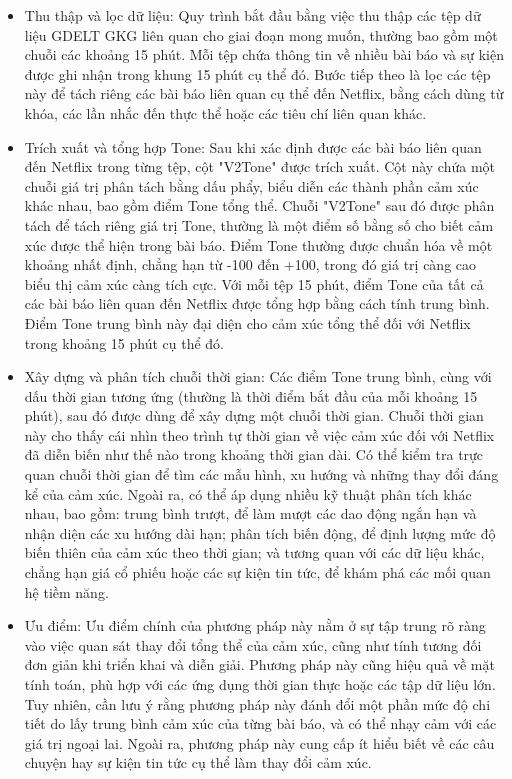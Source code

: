 \begin{itemize}
\item
  Thu thập và lọc dữ liệu: Quy trình bắt đầu bằng việc thu thập các tệp dữ liệu GDELT GKG liên quan cho giai đoạn mong muốn, thường bao gồm một chuỗi các khoảng 15 phút. Mỗi tệp chứa thông tin về nhiều bài báo và sự kiện được ghi nhận trong khung 15 phút cụ thể đó. Bước tiếp theo là lọc các tệp này để tách riêng các bài báo liên quan cụ thể đến Netflix, bằng cách dùng từ khóa, các lần nhắc đến thực thể hoặc các tiêu chí liên quan khác.
\item
  Trích xuất và tổng hợp Tone: Sau khi xác định được các bài báo liên quan đến Netflix trong từng tệp, cột "V2Tone" được trích xuất. Cột này chứa một chuỗi giá trị phân tách bằng dấu phẩy, biểu diễn các thành phần cảm xúc khác nhau, bao gồm điểm Tone tổng thể. Chuỗi "V2Tone" sau đó được phân tách để tách riêng giá trị Tone, thường là một điểm số bằng số cho biết cảm xúc được thể hiện trong bài báo. Điểm Tone thường được chuẩn hóa về một khoảng nhất định, chẳng hạn từ -100 đến +100, trong đó giá trị càng cao biểu thị cảm xúc càng tích cực. Với mỗi tệp 15 phút, điểm Tone của tất cả các bài báo liên quan đến Netflix được tổng hợp bằng cách tính trung bình. Điểm Tone trung bình này đại diện cho cảm xúc tổng thể đối với Netflix trong khoảng 15 phút cụ thể đó.
\item
  Xây dựng và phân tích chuỗi thời gian: Các điểm Tone trung bình, cùng với dấu thời gian tương ứng (thường là thời điểm bắt đầu của mỗi khoảng 15 phút), sau đó được dùng để xây dựng một chuỗi thời gian. Chuỗi thời gian này cho thấy cái nhìn theo trình tự thời gian về việc cảm xúc đối với Netflix đã diễn biến như thế nào trong khoảng thời gian dài. Có thể kiểm tra trực quan chuỗi thời gian để tìm các mẫu hình, xu hướng và những thay đổi đáng kể của cảm xúc. Ngoài ra, có thể áp dụng nhiều kỹ thuật phân tích khác nhau, bao gồm: trung bình trượt, để làm mượt các dao động ngắn hạn và nhận diện các xu hướng dài hạn; phân tích biến động, để định lượng mức độ biến thiên của cảm xúc theo thời gian; và tương quan với các dữ liệu khác, chẳng hạn giá cổ phiếu hoặc các sự kiện tin tức, để khám phá các mối quan hệ tiềm năng.
\item
  Ưu điểm: Ưu điểm chính của phương pháp này nằm ở sự tập trung rõ ràng vào việc quan sát thay đổi tổng thể của cảm xúc, cũng như tính tương đối đơn giản khi triển khai và diễn giải. Phương pháp này cũng hiệu quả về mặt tính toán, phù hợp với các ứng dụng thời gian thực hoặc các tập dữ liệu lớn. Tuy nhiên, cần lưu ý rằng phương pháp này đánh đổi một phần mức độ chi tiết do lấy trung bình cảm xúc của từng bài báo, và có thể nhạy cảm với các giá trị ngoại lai. Ngoài ra, phương pháp này cung cấp ít hiểu biết về các câu chuyện hay sự kiện tin tức cụ thể làm thay đổi cảm xúc.
\end{itemize}

